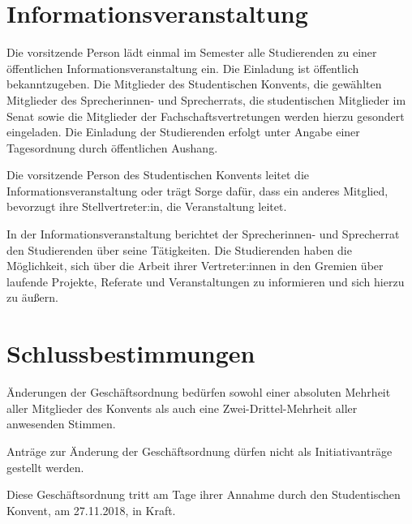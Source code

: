 \documentclass[10pt,a4paper]{scrartcl}
\begin{document}
\section{Informationsveranstaltung}\label{informationsveranstaltung}

\begin{contract}

\label{einladung-zur-informationsveranstaltung}

Die vorsitzende Person lädt einmal im Semester alle Studierenden zu
einer öffentlichen Informationsveranstaltung ein. Die Einladung ist
öffentlich bekanntzugeben. Die Mitglieder des Studentischen Konvents,
die gewählten Mitglieder des Sprecherinnen- und Sprecherrats, die
studentischen Mitglieder im Senat sowie die Mitglieder der
Fachschaftsvertretungen werden hierzu gesondert eingeladen. Die
Einladung der Studierenden erfolgt unter Angabe einer Tagesordnung durch
öffentlichen Aushang.


\label{ablauf-der-informationsveranstaltung}




  Die vorsitzende Person des Studentischen Konvents leitet die
  Informationsveranstaltung oder trägt Sorge dafür, dass ein anderes
  Mitglied, bevorzugt ihre Stellvertreter:in, die Veranstaltung leitet.

  In der Informationsveranstaltung berichtet der Sprecherinnen- und
  Sprecherrat den Studierenden über seine Tätigkeiten. Die Studierenden
  haben die Möglichkeit, sich über die Arbeit ihrer Vertreter:innen in
  den Gremien über laufende Projekte, Referate und Veranstaltungen zu
  informieren und sich hierzu zu äußern.


\end{contract}


\section{Schlussbestimmungen}\label{schlussbestimmungen}

\begin{contract}


\label{uxe4nderungen}

Änderungen der Geschäftsordnung bedürfen sowohl einer absoluten
Mehrheit aller Mitglieder des Konvents als auch eine
Zwei-Drittel-Mehrheit aller anwesenden Stimmen.

Anträge zur Änderung der Geschäftsordnung dürfen nicht als
Initiativanträge gestellt werden.


\label{inkrafttreten}

Diese Geschäftsordnung tritt am Tage ihrer Annahme durch den
Studentischen Konvent, am 27.11.2018, in Kraft.

\end{contract}
\end{document}
